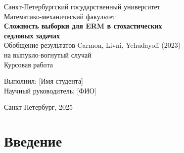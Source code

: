 \documentclass[12pt,a4paper]{article}
\theoremstyle{plain}
\theoremstyle{definition}
\DeclareMathOperator{\Gap}{Gap}
\DeclareMathOperator{\SP}{SP}
\newcommand{\E}{\mathbb{E}}
\newcommand{\cX}{\mathcal{X}}
\newcommand{\cY}{\mathcal{Y}}
\newcommand{\hatF}{\hat{F}}
\begin{document}
\begin{titlepage}
\centering
\vspace*{2cm}
{\large Санкт-Петербургский государственный университет}\\[0.5cm]
{\large Математико-механический факультет}\\[3cm]
{\LARGE\bfseries Сложность выборки для ERM в стохастических\\[0.3cm]
седловых задачах}\\[1cm]
{\large Обобщение результатов Carmon, Livni, Yehudayoff (2023)\\
на выпукло-вогнутый случай}\\[2cm]
{\large Курсовая работа}\\[3cm]
\begin{flushright}
{\large Выполнил: [Имя студента]}\\[0.3cm]
{\large Научный руководитель: [ФИО]}
\end{flushright}
\vfill
{\large Санкт-Петербург, 2025}
\end{titlepage}

\tableofcontents
\newpage

\begin{abstract}
Статья Carmon, Livni, Yehudayoff (2023) решила открытую проблему Фельдмана: для стохастической выпуклой оптимизации (SCO) сложность выборки любого ERM равна $\tilde{O}(d/\varepsilon + 1/\varepsilon^2)$. В настоящей работе мы обобщаем этот результат на стохастические седловые задачи вида $\min_{x\in\cX}\max_{y\in\cY} \E_z[f(x,y,z)]$, где $f$ выпукла по $x$ и вогнута по $y$. Мы показываем, что при $n \ge \tilde{O}((d_x+d_y)/\varepsilon + 1/\varepsilon^2)$ с вероятностью не менее $3/4$ любой Saddle-ERM $(\hat{x},\hat{y})\in\SP(\hatF)$ удовлетворяет $\Gap_F(\hat{x},\hat{y})\le C\varepsilon$ для некоторой абсолютной константы $C>0$. Доказательство следует методологии оригинальной статьи: стохастическое условие первого порядка, пара дивергенций Брегмана, концентрационные неравенства Бернштейна и аргумент $\varepsilon$-сети по совместному пространству $\cX\times\cY$.
\end{abstract}

\section{Введение}
\end{document}
